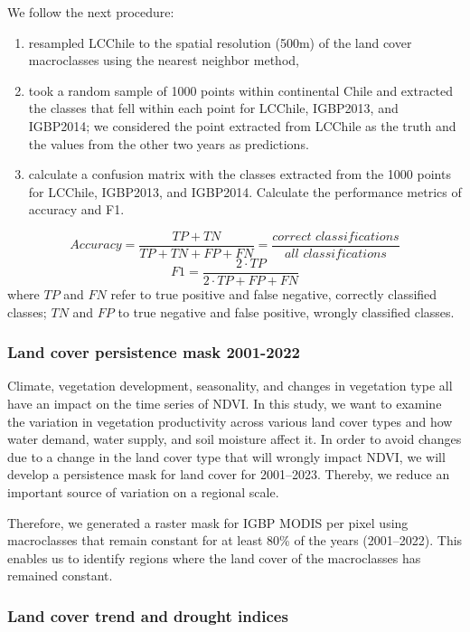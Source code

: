 \documentclass[
  authoryear,
  preprint,
  3p,
  onecolumn]{elsarticle}
\providecommand{\tightlist}{%
  \setlength{\itemsep}{0pt}\setlength{\parskip}{0pt}}\usepackage{longtable,booktabs,array}
\begin{document}
We follow the next procedure:

\begin{enumerate}
\def\labelenumi{\roman{enumi})}
\tightlist
\item
  resampled LCChile to the spatial resolution (500m) of the land cover
  macroclasses using the nearest neighbor method,
\item
  took a random sample of 1000 points within continental Chile and
  extracted the classes that fell within each point for LCChile,
  IGBP2013, and IGBP2014; we considered the point extracted from LCChile
  as the truth and the values from the other two years as predictions.
\item
  calculate a confusion matrix with the classes extracted from the 1000
  points for LCChile, IGBP2013, and IGBP2014. Calculate the performance
  metrics of accuracy and F1.
\end{enumerate}

\[Accuracy = \frac{TP+TN}{TP+TN+FP+FN}=\frac{correct\,\, classifications}{all\,\, classifications}\]
\[F1=\frac{2\cdot TP}{2\cdot TP + FP +FN}\] where \(TP\) and \(FN\)
refer to true positive and false negative, correctly classified classes;
\(TN\) and \(FP\) to true negative and false positive, wrongly
classified classes.

\hypertarget{land-cover-persistence-mask-2001-2022}{%
\subsubsection{Land cover persistence mask
2001-2022}\label{land-cover-persistence-mask-2001-2022}}

Climate, vegetation development, seasonality, and changes in vegetation
type all have an impact on the time series of NDVI. In this study, we
want to examine the variation in vegetation productivity across various
land cover types and how water demand, water supply, and soil moisture
affect it. In order to avoid changes due to a change in the land cover
type that will wrongly impact NDVI, we will develop a persistence mask
for land cover for 2001--2023. Thereby, we reduce an important source of
variation on a regional scale.

Therefore, we generated a raster mask for IGBP MODIS per pixel using
macroclasses that remain constant for at least 80\% of the years
(2001--2022). This enables us to identify regions where the land cover
of the macroclasses has remained constant.

\hypertarget{land-cover-trend-and-drought-indices}{%
\subsubsection{Land cover trend and drought
indices}\label{land-cover-trend-and-drought-indices}}
\end{document}
